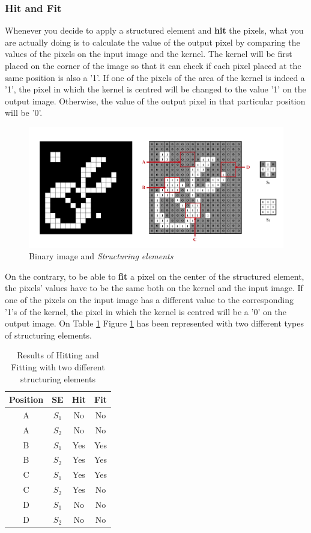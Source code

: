 \subsubsection{Hit and Fit}
Whenever you decide to apply a structured element and \textbf{hit} the pixels, what you are actually doing is to calculate the value of the output pixel by comparing the values of the pixels on the input image and the kernel. The kernel will be first placed on the corner of the image so that it can check if each pixel placed at the same position is also a '1'. If one of the pixels of the area of the kernel is indeed a '1', the pixel in which the kernel is centred will be changed to the value '1' on the output image. Otherwise, the value of the output pixel in that particular position will be '0'.
\begin{figure}[htbp]
\centering
\includegraphics[width=1\textwidth]{Pictures/Theory/FitHitKernels.png}
\caption{Binary image and \textit{Structuring elements}}
\label{fig:FitHit}
\end{figure}

On the contrary, to be able to \textbf{fit} a pixel on the center of the structured element, the pixels' values have to be the same both on the kernel and the input image. If one of the pixels on the input image has a different value to the corresponding '1's of the kernel, the pixel in which the kernel is centred will be a '0' on the output image. On Table \ref{tab:HitFitResults} Figure \ref{fig:FitHit} has been represented with two different types of structuring elements.
\begin{table}[htbp]
\centering
\begin{tabular}{|c|c|c|c|}
\hline
 \:Position\: &SE &\:\:\:Hit\:\:\: &\:\:\:Fit\:\:\: \\\hline
 \hline
 A &$S_{1}$ &No &No\\\hline
 A &$S_{2}$ &No &No\\\hline
 B &$S_{1}$ &Yes &Yes\\\hline
 B &$S_{2}$ &Yes &Yes\\\hline
 C &$S_{1}$ &Yes &Yes\\\hline
 C &$S_{2}$ &Yes &No\\\hline
 D &$S_{1}$ &No &No\\\hline
 D &$S_{2}$ &No &No\\\hline
\end{tabular}
\caption{Results of Hitting and Fitting with two different structuring elements}
\label{tab:HitFitResults}
\end{table}

